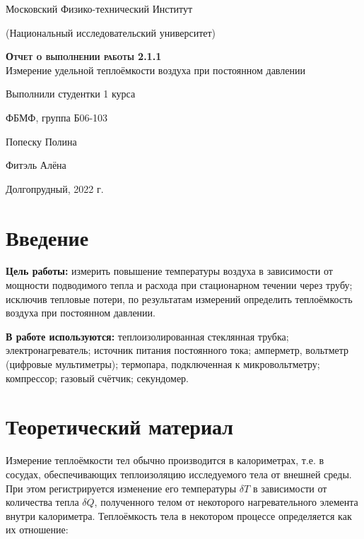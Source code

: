 \documentclass[12pt,a4paper]{article}
\begin{document}
\begin{titlepage}
  \begin{center}
    \huge
    Московский Физико-технический Институт
    
    (Национальный исследовательский университет)
    \vspace{0.5cm}

   
    \vspace{0.25cm}
 
    \vfill
 
    \vfill

    \textsc{\bf{Отчет о выполнении работы 2.1.1}}\\[3mm]
    
    {\LARGE  
Измерение удельной теплоёмкости воздуха при постоянном давлении}
  \bigskip
    \vfill
    
\end{center}
\vfill
\begin{flushright}

    Выполнили студентки 1 курса
    
    ФБМФ, группа Б06-103

    Попеску Полина
    
    
    Фитэль Алёна

\end{flushright}
\bigskip


\vfill

\begin{center}
  Долгопрудный, 2022 г.
\end{center}
\end{titlepage}

\section{Введение}

\textbf{Цель работы:} измерить повышение температуры воздуха в зависимости от мощности
	подводимого тепла и расхода при стационарном течении через трубу; исключив тепловые потери, по результатам измерений определить теплоёмкость воздуха при постоянном давлении.

\textbf{В работе используются:} теплоизолированная стеклянная трубка; электронагреватель; источник питания постоянного тока; амперметр, вольтметр (цифровые мультиметры); термопара, подключенная к микровольтметру; компрессор; газовый счётчик;
	секундомер.

\section{Теоретический материал}
Измерение теплоёмкости тел обычно производится в калориметрах, т.е. в сосудах, обеспечивающих теплоизоляцию исследуемого тела от внешней среды. При этом регистрируется изменение его температуры $\delta T$ в зависимости от количества тепла $\delta Q$, полученного телом от некоторого нагревательного элемента внутри калориметра. Теплоёмкость тела в некотором процессе определяется как их отношение:
\end{document}
